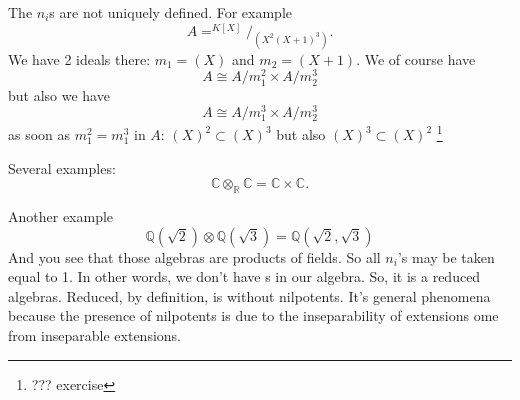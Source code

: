 \begin{remark}
  The $n_i$s are not uniquely defined. For example
  \[
  A = ^{K\left[X\right]}/_{\left(X^2 \left(X+1\right)^3\right)}.
  \]
  We have 2 ideals there:
  $m_1 = (X)$ and $m_2 = (X+1)$.
  We of course have
  \[
  A \cong A/m_1^2 \times A/m_2^3
  \]
  but also we have
  \[
  A \cong A/m_1^3 \times A/m_2^3
  \]
  as soon as $m_1^2 = m_1^3$ in $A$:
  $(X)^2 \subset (X)^3$ but also
  $(X)^3 \subset (X)^2$
  \footnote{
    ??? exercise 
  }
\end{remark}

Several examples:
\[
\mathbb{C} \otimes_\mathbb{R} \mathbb{C} =
\mathbb{C} \times \mathbb{C}.
\]

Another example
\[
\mathbb{Q}\left(\sqrt{2}\right)
\otimes
\mathbb{Q}\left(\sqrt{3}\right) =
\mathbb{Q}\left(\sqrt{2}, \sqrt{3}\right)
\]
And you see that those algebras are products of fields.
So all $n_i$'s may be taken equal to 1. In other words, we don't have
s in our algebra. So, it is a reduced
algebras. Reduced, by definition, is without nilpotents.     
It's general phenomena because the presence of nilpotents is due to the
inseparability of extensions ome from inseparable extensions.  
